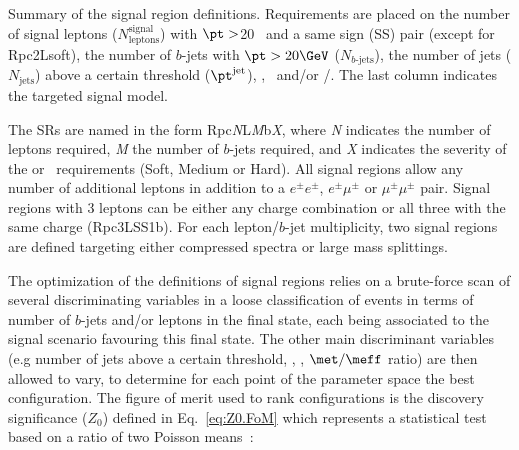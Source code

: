 \begin{table}[tbh!]
{Summary of the signal region definitions. 
Requirements are placed on the number of signal leptons ($N_{\textrm{leptons}}^{\textrm{signal}}$) with $\pt>$20 \GeV~and a same sign (SS) pair (except for Rpc2Lsoft), the number of 
$b$-jets with $\pt>20 \GeV$ ($N_{b\textrm{-jets}}$), the number of jets ($N_{\textrm{jets}}$) above a certain \pt threshold ($\pt^{\textrm{jet}}$), 
\met, \meff\ and/or \met/\meff. 
The last column indicates the targeted signal model. 
}
\label{tab:SRdef3}
\end{table}

The SRs are named in the form Rpc\textit{N}L{\textit M}b{\textit X}, where {\textit N} indicates the number of leptons required, {\textit M} the number of $b$-jets required, and {\textit X} indicates the severity 
of the \met or \meff\ requirements (Soft, Medium or Hard). All signal regions allow any number of additional leptons in addition to a $e^\pm e^\pm$,
$e^\pm \mu^\pm$ or $\mu^\pm \mu^\pm$ pair. Signal regions with 3 leptons can be either any charge combination or all three with the same charge (Rpc3LSS1b).
For each lepton/$b$-jet multiplicity, two signal regions are defined targeting either compressed spectra or large mass splittings. 

The optimization of the definitions of signal regions relies on a brute-force
scan of several discriminating variables in a loose classification of events 
in terms of number of $b$-jets and/or leptons in the final state, each being 
associated to the signal scenario favouring this final state.
The other main discriminant variables (e.g number of jets above a certain \pt threshold, \meff, \met, $\met/\meff$ ratio) are then 
allowed to vary, 
to determine for each point of the parameter space the best configuration. 
The figure of merit used to rank configurations is the discovery significance ($Z_0$)
defined in Eq.~\ref{eq:Z0.FoM} which represents
a statistical test based on a ratio of two Poisson means~\cite{Cousins:2009}:

